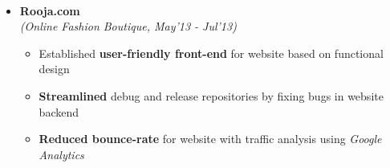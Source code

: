 \\[\lsep]

\begin{itemize}

	\item \textbf{Rooja.com} \\
	\emph{(\textit{Online Fashion Boutique}, May'13 - Jul'13)} \\[-0.6cm]

		\begin{itemize}\itemsep \isep
		\item Established \textbf{user-friendly front-end} for website based on functional design
		\item \textbf{Streamlined} debug and release repositories by fixing bugs in website backend
		\item \textbf{Reduced bounce-rate} for website with traffic analysis using \textit{Google Analytics}
		\end{itemize}

\end{itemize}
